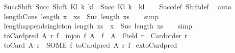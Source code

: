 \begin{isabellebody}
\isamarkupfalse%
\ Succ{\isacharunderscore}{\kern0pt}Shift{\isacharcolon}{\kern0pt}\ {\isachardoublequoteopen}Succ\ {\isacharparenleft}{\kern0pt}Shift\ Kl\ k{\isacharparenright}{\kern0pt}\ kl\ {\isacharequal}{\kern0pt}\ Succ\ Kl\ {\isacharparenleft}{\kern0pt}k\ {\isacharhash}{\kern0pt}\ kl{\isacharparenright}{\kern0pt}{\isachardoublequoteclose}\isanewline
%
\isadelimproof
\ \ %
\endisadelimproof
%
\isatagproof
{}\isamarkupfalse%
\ Succ{\isacharunderscore}{\kern0pt}def\ Shift{\isacharunderscore}{\kern0pt}def\ \isamarkupfalse%
\ auto%
\endisatagproof
{\isafoldproof}%
%
\isadelimproof
\isanewline
%
\endisadelimproof
\isanewline
{}\isamarkupfalse%
\ length{\isacharunderscore}{\kern0pt}Cons{\isacharcolon}{\kern0pt}\ {\isachardoublequoteopen}length\ {\isacharparenleft}{\kern0pt}x\ {\isacharhash}{\kern0pt}\ xs{\isacharparenright}{\kern0pt}\ {\isacharequal}{\kern0pt}\ Suc\ {\isacharparenleft}{\kern0pt}length\ xs{\isacharparenright}{\kern0pt}{\isachardoublequoteclose}\isanewline
%
\isadelimproof
\ \ %
\endisadelimproof
%
\isatagproof
{}\isamarkupfalse%
\ simp%
\endisatagproof
{\isafoldproof}%
%
\isadelimproof
\isanewline
%
\endisadelimproof
\isanewline
{}\isamarkupfalse%
\ length{\isacharunderscore}{\kern0pt}append{\isacharunderscore}{\kern0pt}singleton{\isacharcolon}{\kern0pt}\ {\isachardoublequoteopen}length\ {\isacharparenleft}{\kern0pt}xs\ {\isacharat}{\kern0pt}\ {\isacharbrackleft}{\kern0pt}x{\isacharbrackright}{\kern0pt}{\isacharparenright}{\kern0pt}\ {\isacharequal}{\kern0pt}\ Suc\ {\isacharparenleft}{\kern0pt}length\ xs{\isacharparenright}{\kern0pt}{\isachardoublequoteclose}\isanewline
%
\isadelimproof
\ \ %
\endisadelimproof
%
\isatagproof
{}\isamarkupfalse%
\ simp%
\endisatagproof
{\isafoldproof}%
%
\isadelimproof
\isanewline
%
\endisadelimproof
\isanewline
\isanewline
{}\isamarkupfalse%
\ {\isachardoublequoteopen}toCard{\isacharunderscore}{\kern0pt}pred\ A\ r\ f\ {\isasymequiv}\ inj{\isacharunderscore}{\kern0pt}on\ f\ A\ {\isasymand}\ f\ {\isacharbackquote}{\kern0pt}\ A\ {\isasymsubseteq}\ Field\ r\ {\isasymand}\ Card{\isacharunderscore}{\kern0pt}order\ r{\isachardoublequoteclose}\isanewline
{}\isamarkupfalse%
\ {\isachardoublequoteopen}toCard\ A\ r\ {\isasymequiv}\ SOME\ f{\isachardot}{\kern0pt}\ toCard{\isacharunderscore}{\kern0pt}pred\ A\ r\ f{\isachardoublequoteclose}\isanewline
\isanewline
{}\isamarkupfalse%
\ ex{\isacharunderscore}{\kern0pt}toCard{\isacharunderscore}{\kern0pt}pred{\isacharcolon}{\kern0pt}\isanewline

\end{isabellebody}
